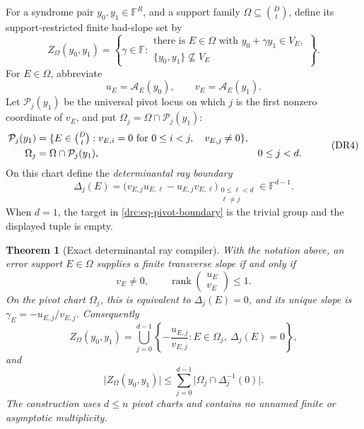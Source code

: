 \documentclass[11pt,a4paper]{amsart}
\numberwithin{equation}{section}
\newtheorem{theorem}{Theorem}[section]
\theoremstyle{remark}
\DeclareMathOperator{\rank}{rank}
\newcommand{\F}{\mathbb F}
\newcommand{\abs}[1]{\lvert #1\rvert}
\begin{document}
For a syndrome pair \(y_0,y_1\in\F^R\), and a support family
\(\Omega\subseteq\binom Dt\), define its support-restricted finite bad-slope
set by
\[
 Z_\Omega(y_0,y_1)=
 \left\{\gamma\in\F:\begin{array}{l}
   \text{there is \(E\in\Omega\) with }
       y_0+\gamma y_1\in V_E,\\[-1mm]
   \{y_0,y_1\}\not\subseteq V_E
 \end{array}\right\}.
 \tag{DR3}\label{drc:eq-restricted-rays}
\]
For \(E\in\Omega\), abbreviate
\[
              u_E=\mathcal A_E(y_0),\qquad
              v_E=\mathcal A_E(y_1).
\]
Let \(\mathcal P_j(y_1)\) be the universal pivot locus on which \(j\) is
the first nonzero coordinate of \(v_E\), and put
\(\Omega_j=\Omega\cap\mathcal P_j(y_1)\):
\[
 \begin{aligned}
 \mathcal P_j(y_1)
   &=\{E\in\tbinom Dt:
          v_{E,i}=0\ \text{for }0\le i<j,\quad v_{E,j}\ne0\},\\
 \Omega_j&=\Omega\cap\mathcal P_j(y_1),
       &&0\le j<d.
 \end{aligned}
 \tag{DR4}\label{drc:eq-pivot-chart}
\]
On this chart define the \emph{determinantal ray boundary}
\[
 \Delta_j(E)=
 \bigl(v_{E,j}u_{E,\ell}-u_{E,j}v_{E,\ell}\bigr)_
       {\substack{0\le\ell<d\\ \ell\ne j}}
 \in\F^{d-1}.
 \tag{DR5}\label{drc:eq-pivot-boundary}
\]
When \(d=1\), the target in \eqref{drc:eq-pivot-boundary} is the trivial
group and the displayed tuple is empty.

\begin{theorem}[Exact determinantal ray compiler]
\label{drc:thm-exact-compiler}
With the notation above, an error support \(E\in\Omega\) supplies a finite
transverse slope if and only if
\[
 v_E\ne0,
 \qquad
 \rank\begin{pmatrix}u_E\\v_E\end{pmatrix}\le1.
 \tag{DR6}\label{drc:eq-rank-one-condition}
\]
On the pivot chart \(\Omega_j\), this is equivalent to
\(\Delta_j(E)=0\), and its unique slope is
\(
 \gamma_E=-u_{E,j}/v_{E,j}
\).  Consequently
\[
 Z_\Omega(y_0,y_1)=
 \bigcup_{j=0}^{d-1}
 \left\{-\frac{u_{E,j}}{v_{E,j}}:
       E\in\Omega_j,\ \Delta_j(E)=0\right\},
 \tag{DR7}\label{drc:eq-exact-ray-union}
\]
and
\[
 \abs{Z_\Omega(y_0,y_1)}
 \le
 \sum_{j=0}^{d-1}
 \abs{\Omega_j\cap\Delta_j^{-1}(0)}.
 \tag{DRC}\label{drc:eq-direct-compiler}
\]
The construction uses \(d\le n\) pivot charts and contains no unnamed
finite or asymptotic multiplicity.
\end{theorem}
\end{document}
